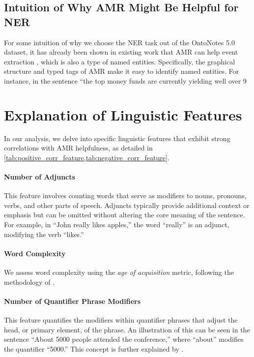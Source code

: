 \begin{enumerate}
{\subsection{Intuition of Why AMR Might Be Helpful for NER}\label{appd:intuition}
For some intuition of why we choose the NER task out of the OntoNotes 5.0 dataset, it has already been shown in existing work that AMR can help event extraction \citep{Garg2015Extracting,huang2018zero}, which is also a type of named entities. Specifically, the graphical structure and typed tags of AMR make it easy to identify named entities.
For instance, 
in the sentence ``the top money funds are currently yielding well over 9\

\section{Explanation of Linguistic Features}
\label{sec:feature_explanation}

In our analysis, we delve into specific linguistic features that exhibit strong correlations with AMR helpfulness, as detailed in \cref{tab:positive_corr_feature,tab:negative_corr_feature}.

\paragraph{Number of Adjuncts} This feature involves counting words that serve as modifiers to nouns, pronouns, verbs, and other parts of speech. Adjuncts typically provide additional context or emphasis but can be omitted without altering the core meaning of the sentence. For example, in “John really likes apples,” the word “really” is an adjunct, modifying the verb “likes.”

\paragraph{Word Complexity} We assess word complexity using the \textit{age of acquisition} metric, following the methodology of \citet{Kuperman2012Ageofacquisition}.

\paragraph{Number of Quantifier Phrase Modifiers} This feature quantifies the modifiers within quantifier phrases that adjust the head, or primary element, of the phrase. An illustration of this can be seen in the sentence “About 5000 people attended the conference,” where “about” modifies the quantifier “5000.” This concept is further explained by \citet{de-marneffe2008stanford}.

}
\end{enumerate}
